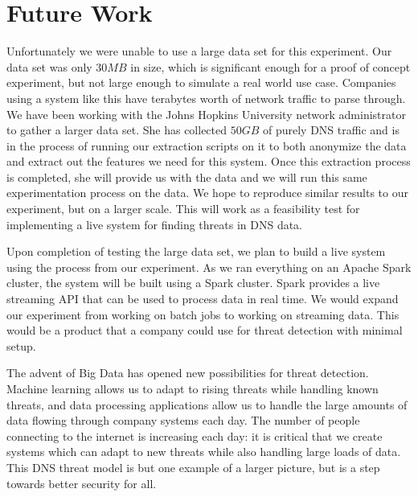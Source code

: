 \section{Future Work}

Unfortunately we were unable to use a large data set for this experiment.
Our data set was only $30 MB$ in size, which is significant enough for a proof of concept experiment,
but not large enough to simulate a real world use case.
Companies using a system like this have terabytes worth of network traffic to parse through.
We have been working with the Johns Hopkins University network administrator to gather a larger
data set.
She has collected $50 GB$ of purely DNS traffic and is in the process of running our extraction
scripts on it to both anonymize the data and extract out the features we need for this system.
Once this extraction process is completed, she will provide us with the data and we will run this
same experimentation process on the data.
We hope to reproduce similar results to our experiment, but on a larger scale.
This will work as a feasibility test for implementing a live system for finding threats in DNS data.

Upon completion of testing the large data set, we plan to build a live system using the process
from our experiment.
As we ran everything on an Apache Spark cluster, the system will be built using a Spark cluster.
Spark provides a live streaming API that can be used to process data in real time.
We would expand our experiment from working on batch jobs to working on streaming data.
This would be a product that a company could use for threat detection with minimal setup.

The advent of Big Data has opened new possibilities for threat detection.
Machine learning allows us to adapt to rising threats while handling known threats, and data
processing applications allow us to handle the large amounts of data flowing through company systems
each day.
The number of people connecting to the internet is increasing each day: it is critical that we create
systems which can adapt to new threats while also handling large loads of data.
This DNS threat model is but one example of a larger picture, but is a step towards better security for all.
